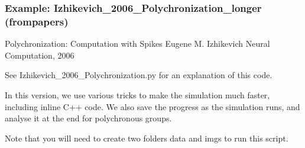 \documentclass[letterpaper,10pt,english]{manual}
\begin{document}
\resetcurrentobjects
\hypertarget{--doc-examples-frompapers_Izhikevich_2006_Polychronization_longer}{}

\hypertarget{index-31}{}\subsubsection{Example: Izhikevich\_2006\_Polychronization\_longer (frompapers)}

Polychronization: Computation with Spikes
Eugene M. Izhikevich
Neural Computation, 2006

See Izhikevich\_2006\_Polychronization.py for an explanation of this code.

In this version, we use various tricks to make the simulation much faster,
including inline C++ code. We also save the progress as the simulation runs,
and analyse it at the end for polychronous groups.

Note that you will need to create two folders data and imgs to run this
script.
\end{document}
